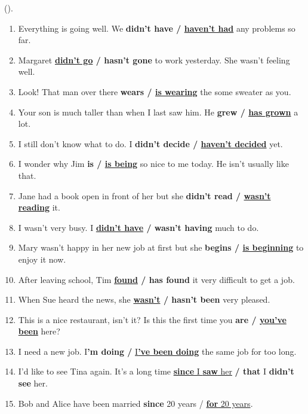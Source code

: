 \documentclass[main.tex]{subfiles}
\begin{document}
 (\hyperref[task:2024-02-14]{\color{blue}{перейти к тексту задания без выбранного варианта ответа}}).
\vspace{3mm}

\begin{enumerate}[nosep,leftmargin=*]
	\itemsep\eitsp
	\setcounter{enumi}{5}
	\item Everything is going well. We \textbf{didn't have / \uline{haven't had}} any problems so far.
	\item Margaret \textbf{\uline{didn't go} / hasn't gone} to work yesterday. She wasn't feeling well.
	\item Look! That man over there \textbf{wears / \uline{is wearing}} the some sweater as you.
	\item Your son is much taller than when I last saw him. He \textbf{grew / \uline{has grown}} a lot.
	\item I still don't know what to do. I \textbf{didn't decide / \uline{haven't decided}} yet.
	\item I wonder why Jim \textbf{is / \uline{is being}} so nice to me today. He isn't usually like that.
	\item Jane had a book open in front of her but she \textbf{didn't read / \uline{wasn't reading}} it.
	\item I wasn't very busy. I \textbf{\uline{didn't have} / wasn't having} much to do.
	\item Mary wasn't happy in her new job at first but she \textbf{begins / \uline{is beginning}} to enjoy it now.
	\item After leaving school, Tim \textbf{\uline{found} / has found} it very difficult to get a job.
	\item When Sue heard the news, she \textbf{\uline{wasn't} / hasn't been} very pleased.
	\item This is a nice restaurant, isn't it? Is this the first time you \textbf{are / \uline{you've been}} here?
	\item I need a new job. I\textbf{'m doing /} \uline{I\textbf{'ve been doing}} the same job for too long.
	\item I'd like to see Tina again. It's a long time \uline{\textbf{since} I \textbf{saw} her} \textbf{/ that} I \textbf{didn't see} her.
	\item Bob and Alice have been married \textbf{since} 20 years / \uline{\textbf{for} 20 years}.
\end{enumerate}
\end{document}
